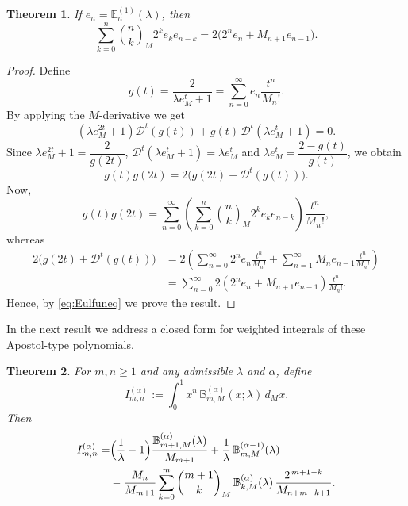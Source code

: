 \documentclass[10pt,a4paper]{amsart}
\newtheorem{theorem}{Theorem}[section]
\numberwithin{equation}{section}
\newcommand{\B}{\mathbb{B}}
\newcommand{\E}{\mathbb{E}}
\begin{document}
\begin{theorem}
If $e_n = \E_n^{(1)}(\lambda)$, then
\[
\sum_{k=0}^{n}\binom{n}{k}_M2^ke_ke_{n-k} = 2\bigl(2^ne_n+M_{n+1}e_{n-1}\bigr).
\]
\end{theorem}
\begin{proof}
Define
\[
g(t)=\frac{2}{\lambda e_M^t+1}=\sum_{n=0}^\infty e_n\frac{t^n}{M_n!}.
\]
By applying the $M$-derivative we get
\[
(\lambda e_M^{2t}+1)\mathcal D^t(g(t)) + g(t)\,\mathcal D^t(\lambda e_M^t+1)=0.
\]
Since $\lambda e_M^{2t}+1=\dfrac{2}{g(2t)}$, $\mathcal D^t(\lambda e_M^t+1)=\lambda e_M^t$ and $\lambda e_M^t=\dfrac{2-g(t)}{g(t)}$, we obtain
\begin{equation}\label{eq:Eulfuneq}
g(t)g(2t) = 2\bigl(g(2t)+ \mathcal{D}^t(g(t))\bigr).
\end{equation}
Now,
\[
g(t)g(2t) = \sum_{n=0}^{\infty}\left(\sum_{k=0}^{n}\binom{n}{k}_M2^ke_ke_{n-k}\right)\frac{t^n}{M_n!},
\]
whereas
\begin{align*}
2\bigl(g(2t)+ \mathcal{D}^t(g(t))\bigr) &= 2\left(\sum_{n=0}^{\infty}2^ne_n\frac{t^n}{M_n!} + \sum_{n=1}^{\infty}M_ne_{n-1}\frac{t^n}{M_n!}\right)\\
&= \sum_{n=0}^{\infty}2\left(2^ne_n+M_{n+1}e_{n-1}\right)\frac{t^n}{M_n!}.
\end{align*}
Hence, by \eqref{eq:Eulfuneq} we prove the result.
\end{proof}

In the next result we address a closed form for weighted integrals of these Apostol-type polynomials.


\begin{theorem}\label{thm:int-bernoulli-recurrence}
For $m,n\ge 1$ and any admissible $\lambda$ and $\alpha$, define
\[
I_{m,n}^{(\alpha)}:=\int_0^1 x^n\,\B_{m,M}^{(\alpha)}(x;\lambda)\,d_M x.
\]
Then
\begin{equation}\label{eq:bernoulli-recurrence}
\begin{aligned}
I_{m,n}^{(\alpha)} = &\Bigl(\frac{1}{\lambda}-1\Bigr)\frac{\B_{m+1,M}^{(\alpha)}(\lambda)}{M_{m+1}}
      +\frac{1}{\lambda}\,\B_{m,M}^{(\alpha-1)}(\lambda) \\
     &- \frac{M_n}{M_{m+1}}\sum_{k=0}^{m}\binom{m+1}{k}_M\,
        \B_{k,M}^{(\alpha)}(\lambda)\,\frac{2^{\,m+1-k}}{M_{n+m-k+1}}.
\end{aligned}
\end{equation}
\end{theorem}
\end{document}
